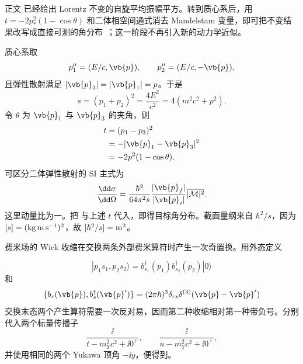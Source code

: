 \begin{derivation}

正文 已经给出 Lorentz 不变的自旋平均振幅平方。转到质心系后，用 $t=-2p_*^2(1-\cos\theta)$ 和二体相空间通式消去 Mandelstam 变量，即可把不变结果改写成直接可测的角分布~；这一阶段不再引入新的动力学近似。

质心系取
\begin{equation*}
 p_1^\mu=(E/c,\vb{p}),\qquad
 p_2^\mu=(E/c,-\vb{p}),
\end{equation*}
且弹性散射满足 $|\vb{p}_3|=|\vb{p}_1|=p$。于是
\begin{equation*}
 s=(p_1+p_2)^2=\frac{4E^2}{c^2}=4(m^2c^2+p^2).
\end{equation*}
令 $\theta$ 为 $\vb{p}_1$ 与 $\vb{p}_3$ 的夹角，则
\begin{align*}
 t&=(p_1-p_3)^2\\
  &=-|\vb{p}_1-\vb{p}_3|^2\\
  &=-2p^2(1-\cos\theta).
\end{align*}
可区分二体弹性散射的 SI 主式为
\begin{equation*}
 \frac{\dd\sigma}{\dd\Omega}
 =\frac{\hbar^2}{64\pi^2s}
 \frac{|\vb{p}_f|}{|\vb{p}_i|}
 \overline{|\mathcal M|^2}.
\end{equation*}
这里动量比为一。把 与上述 $t$ 代入，即得目标角分布。截面量纲来自 $\hbar^2/s$，因为 $[s]=({\rm kg\,m\,s^{-1}})^2$，故 $[\hbar^2/s]={\rm m^2}$。
\end{derivation}

\begin{derivation}[费米子交换为何产生相对负号]
费米场的 Wick 收缩在交换两条外部费米算符时产生一次奇置换。用外态定义

\begin{equation*}
 |p_1s_1,p_2s_2\rangle
 =b_{s_1}^\dagger(p_1)b_{s_2}^\dagger(p_2)|0\rangle
\end{equation*}
和
\begin{equation*}
 \{b_r(\vb{p}),b_s^\dagger(\vb{p}')\}
 =(2\pi\hbar)^3\delta_{rs}\delta^{(3)}(\vb{p}-\vb{p}')
\end{equation*}
交换末态两个产生算符需要一次反对易，因而第二种收缩相对第一种带负号。分别代入两个标量传播子
\begin{equation*}
 \frac{\ii}{t-m_Y^2c^2+\ii0^+},
 \qquad
 \frac{\ii}{u-m_Y^2c^2+\ii0^+},
\end{equation*}
并使用相同的两个 Yukawa 顶角 $-\ii y$，便得到。
\end{derivation}

